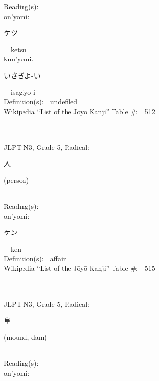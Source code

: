 \begin{multicols}{2}
Reading(s):\ \ \\
{\hspace*{1em}}on'yomi:\ \ \\
{\hspace*{2em}}{\begin{CJK}{UTF8}{min} ケツ \end{CJK}}\ \ ketsu\ \ \\
{\hspace*{1em}}kun'yomi:\ \ \\
{\hspace*{2em}}{\begin{CJK}{UTF8}{min} いさぎよ-い \end{CJK}}\ \ isagiyo-i\ \ \\
Definition(s):\ \ undefiled \\
Wikipedia ``List of the J\=oy\=o Kanji'' Table \#:\ \ 512 \\
\ \ \\
{\fontsize{34pt}{40pt}  }\ \ \\  %
{JLPT N3, Grade 5, Radical:\ \ {\begin{CJK}{UTF8}{min} 人 \end{CJK}} (person) } \\
Reading(s):\ \ \\
{\hspace*{1em}}on'yomi:\ \ \\
{\hspace*{2em}}{\begin{CJK}{UTF8}{min} ケン \end{CJK}}\ \ ken\ \ \\
Definition(s):\ \ affair \\
Wikipedia ``List of the J\=oy\=o Kanji'' Table \#:\ \ 515 \\
\ \ \\
{\fontsize{34pt}{40pt}  }\ \ \\  %
{JLPT N3, Grade 5, Radical:\ \ {\begin{CJK}{UTF8}{min} 阜 \end{CJK}} (mound, dam) } \\
Reading(s):\ \ \\
{\hspace*{1em}}on'yomi:\ \ \\

\end{multicols}
